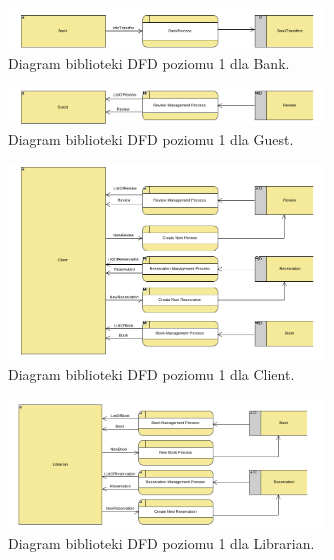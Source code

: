 \documentclass[12pt]{article}
\begin{document}
\begin{figure}[!h]
    \centering
    \includegraphics[width=0.75\textwidth]{Schemat_Bank}
    \caption{Diagram biblioteki DFD poziomu 1 dla Bank.}
\end{figure}

\begin{figure}[!h]
    \centering
    \includegraphics[width=0.75\textwidth]{Schemat_Guest}
    \caption{Diagram biblioteki DFD poziomu 1 dla Guest.}
\end{figure}

\begin{figure}[!h]
    \centering
    \includegraphics[width=0.75\textwidth]{Schemat_Client}
    \caption{Diagram biblioteki DFD poziomu 1 dla Client.}
\end{figure}

\begin{figure}[!h]
    \centering
    \includegraphics[width=0.75\textwidth]{Schemat_Librarian}
    \caption{Diagram biblioteki DFD poziomu 1 dla Librarian.}
\end{figure}
\end{document}
